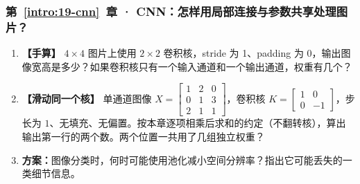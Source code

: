 \subsubsection*{第~\ref*{intro:19-cnn}~章 · CNN：怎样用局部连接与参数共享处理图片？}
\begin{enumerate}[label={},leftmargin=4.8em,itemsep=4pt]
\item[\textbf{C-124.}] \leavevmode{}\label{exercise:C-124}\label{exercise:convolution-output-shape}\label{exercise:linked-19-cnn}  \textbf{【手算】} $4\times4$ 图片上使用 $2\times2$ 卷积核，stride 为 1、padding 为 0，输出图像宽高是多少？如果卷积核只有一个输入通道和一个输出通道，权重有几个？
\item[\textbf{C-125.}] \leavevmode{}\label{exercise:C-125}\label{exercise:convolution-shared-kernel}\textbf{【滑动同一个核】} 单通道图像 $X=\begin{bmatrix}1&2&0\\0&1&3\\2&1&1\end{bmatrix}$，卷积核 $K=\begin{bmatrix}1&0\\0&-1\end{bmatrix}$，步长为 $1$、无填充、无偏置。按本章逐项相乘后求和的约定（不翻转核），算出输出第一行的两个数。两个位置一共用了几组独立权重？
\item[\textbf{C-126.}] \leavevmode{}\label{exercise:C-126}\label{exercise:pooling-detail-loss}\textbf{方案：}图像分类时，何时可能使用池化减小空间分辨率？指出它可能丢失的一类细节信息。
\end{enumerate}
